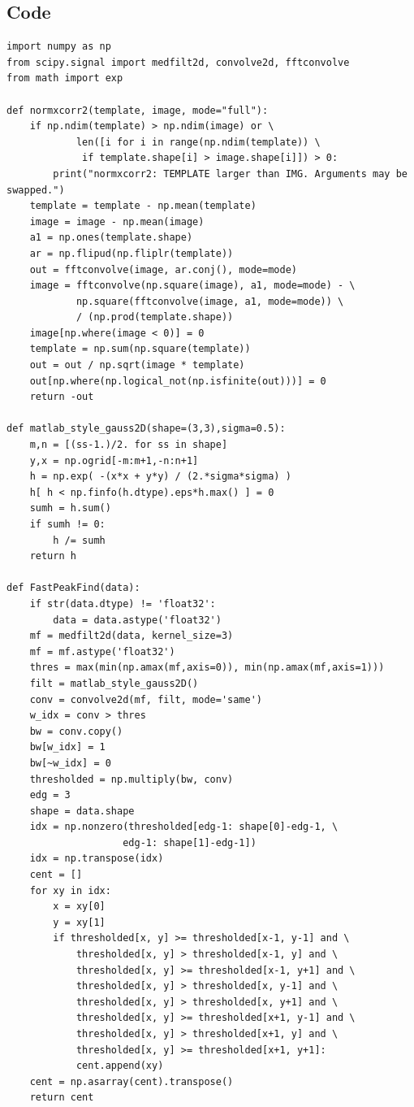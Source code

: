 \subsection{Code}
\begin{verbatim}
import numpy as np
from scipy.signal import medfilt2d, convolve2d, fftconvolve
from math import exp

def normxcorr2(template, image, mode="full"):
    if np.ndim(template) > np.ndim(image) or \
            len([i for i in range(np.ndim(template)) \
             if template.shape[i] > image.shape[i]]) > 0:
        print("normxcorr2: TEMPLATE larger than IMG. Arguments may be swapped.")
    template = template - np.mean(template)
    image = image - np.mean(image)
    a1 = np.ones(template.shape)
    ar = np.flipud(np.fliplr(template))
    out = fftconvolve(image, ar.conj(), mode=mode)
    image = fftconvolve(np.square(image), a1, mode=mode) - \
            np.square(fftconvolve(image, a1, mode=mode)) \
            / (np.prod(template.shape))
    image[np.where(image < 0)] = 0
    template = np.sum(np.square(template))
    out = out / np.sqrt(image * template)
    out[np.where(np.logical_not(np.isfinite(out)))] = 0
    return -out

def matlab_style_gauss2D(shape=(3,3),sigma=0.5):
    m,n = [(ss-1.)/2. for ss in shape]
    y,x = np.ogrid[-m:m+1,-n:n+1]
    h = np.exp( -(x*x + y*y) / (2.*sigma*sigma) )
    h[ h < np.finfo(h.dtype).eps*h.max() ] = 0
    sumh = h.sum()
    if sumh != 0:
        h /= sumh
    return h

def FastPeakFind(data):
    if str(data.dtype) != 'float32':
        data = data.astype('float32')
    mf = medfilt2d(data, kernel_size=3)
    mf = mf.astype('float32')
    thres = max(min(np.amax(mf,axis=0)), min(np.amax(mf,axis=1)))
    filt = matlab_style_gauss2D()
    conv = convolve2d(mf, filt, mode='same')
    w_idx = conv > thres
    bw = conv.copy()
    bw[w_idx] = 1
    bw[~w_idx] = 0
    thresholded = np.multiply(bw, conv)
    edg = 3
    shape = data.shape
    idx = np.nonzero(thresholded[edg-1: shape[0]-edg-1, \
                    edg-1: shape[1]-edg-1])
    idx = np.transpose(idx)
    cent = []
    for xy in idx:
        x = xy[0]
        y = xy[1]
        if thresholded[x, y] >= thresholded[x-1, y-1] and \
            thresholded[x, y] > thresholded[x-1, y] and \
            thresholded[x, y] >= thresholded[x-1, y+1] and \
            thresholded[x, y] > thresholded[x, y-1] and \
            thresholded[x, y] > thresholded[x, y+1] and \
            thresholded[x, y] >= thresholded[x+1, y-1] and \
            thresholded[x, y] > thresholded[x+1, y] and \
            thresholded[x, y] >= thresholded[x+1, y+1]:
            cent.append(xy)
    cent = np.asarray(cent).transpose()
    return cent


\end{verbatim}
